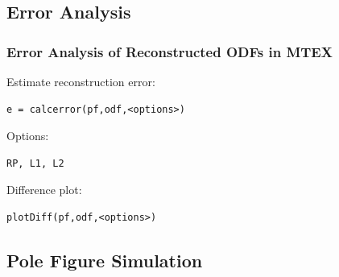 \documentclass{beamer}
\newcommand{\MTEX}{{\bf {\color{red}M}TEX\,}}%
\begin{document}
\subsection*{Error Analysis}

\begin{frame}[fragile] 
  \frametitle{Error Analysis of Reconstructed ODFs in  \MTEX}
  
Estimate reconstruction error:
\begin{lstlisting}
e = calcerror(pf,odf,<options>)
\end{lstlisting}

Options:
\begin{lstlisting}
RP, L1, L2
\end{lstlisting}

Difference plot:
\begin{lstlisting}
plotDiff(pf,odf,<options>)
\end{lstlisting}


\vspace{3mm}

\end{frame}

\subsection{Pole Figure Simulation}
\end{document}
